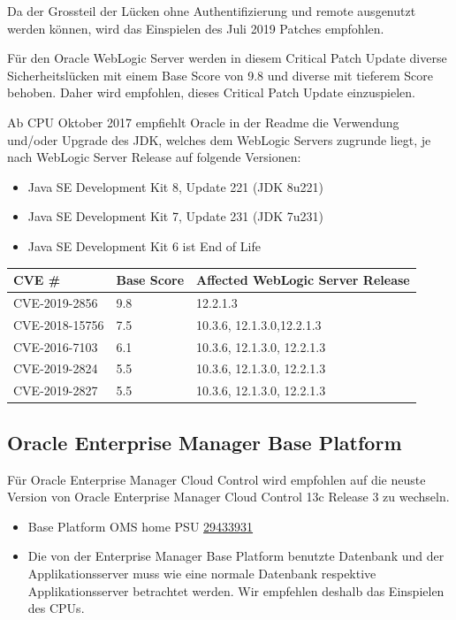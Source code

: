Da der Grossteil der Lücken ohne Authentifizierung und remote ausgenutzt
werden können, wird das Einspielen des Juli 2019 Patches empfohlen.

Für den Oracle WebLogic Server werden in diesem Critical Patch Update
diverse Sicherheitslücken mit einem Base Score von 9.8 und diverse mit
tieferem Score behoben. Daher wird empfohlen, dieses Critical Patch
Update einzuspielen.

Ab CPU Oktober 2017 empfiehlt Oracle in der Readme die Verwendung
und/oder Upgrade des JDK, welches dem WebLogic Servers zugrunde liegt,
je nach WebLogic Server Release auf folgende Versionen:

\begin{itemize}
\tightlist
\item
  Java SE Development Kit 8, Update 221 (JDK 8u221)
\item
  Java SE Development Kit 7, Update 231 (JDK 7u231)
\item
  Java SE Development Kit 6 ist End of Life
\end{itemize}

\begin{longtable}[]{@{}lll@{}}
\toprule
CVE \# & Base Score & Affected WebLogic Server Release\tabularnewline
\midrule
\endhead
CVE-2019-2856 & 9.8 & 12.2.1.3\tabularnewline
CVE-2018-15756 & 7.5 & 10.3.6, 12.1.3.0,12.2.1.3\tabularnewline
CVE-2016-7103 & 6.1 & 10.3.6, 12.1.3.0, 12.2.1.3\tabularnewline
CVE-2019-2824 & 5.5 & 10.3.6, 12.1.3.0, 12.2.1.3\tabularnewline
CVE-2019-2827 & 5.5 & 10.3.6, 12.1.3.0, 12.2.1.3\tabularnewline
\bottomrule
\end{longtable}

\hypertarget{oracle-enterprise-manager-base-platform}{%
\subsection{Oracle Enterprise Manager Base
Platform}\label{oracle-enterprise-manager-base-platform}}

Für Oracle Enterprise Manager Cloud Control wird empfohlen auf die
neuste Version von Oracle Enterprise Manager Cloud Control 13c Release 3
zu wechseln.

\begin{itemize}
\tightlist
\item
  Base Platform OMS home PSU
  \href{https://support.oracle.com/epmos/faces/ui/patch/PatchDetail.jspx?patchId=29433931}{29433931}
\item
  Die von der Enterprise Manager Base Platform benutzte Datenbank und
  der Applikationsserver muss wie eine normale Datenbank respektive
  Applikationsserver betrachtet werden. Wir empfehlen deshalb das
  Einspielen des CPUs.
\end{itemize}

